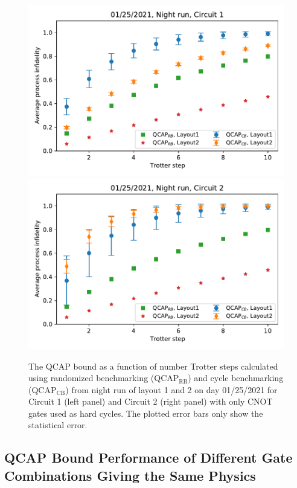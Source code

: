 \begin{figure}[htpb]
    \includegraphics[scale=0.55]{QCAP_CB_RB_Data_01_25_2021_Layout_1_2C1_Night.pdf}
    \includegraphics[scale=0.55]{QCAP_CB_RB_Data_01_25_2021_Layout_1_2C2_Night.pdf}
    \caption{The QCAP bound as a function of number Trotter steps calculated using randomized benchmarking (QCAP$_{\text{RB}}$) and cycle  benchmarking (QCAP$_{\text{CB}}$) from night run of layout 1 and 2 on day 01/25/2021 for Circuit 1 (left panel) and Circuit 2 (right panel) with only CNOT gates used as hard cycles. The  plotted  error  bars  only show the statistical error.}
    \label{fig:QCAP_circ1_circ2_25th_L1L2_Night}
\end{figure}





\subsection{QCAP Bound Performance of Different Gate Combinations Giving the Same Physics}
\label{sec:circ1_vs_circ2_QCAP}


